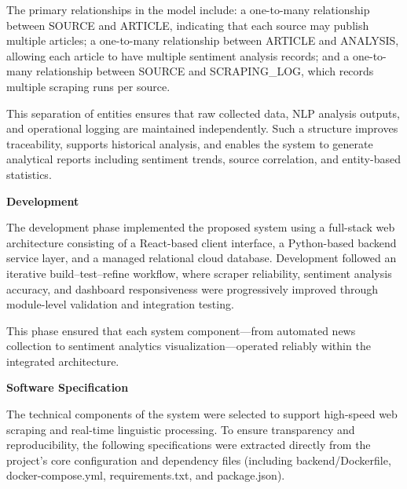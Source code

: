 The primary relationships in the model include: a one-to-many relationship between SOURCE and ARTICLE, indicating that each source may publish multiple articles; a one-to-many relationship between ARTICLE and ANALYSIS, allowing each article to have multiple sentiment analysis records; and a one-to-many relationship between SOURCE and SCRAPING\_LOG, which records multiple scraping runs per source.

This separation of entities ensures that raw collected data, NLP analysis outputs, and operational logging are maintained independently. Such a structure improves traceability, supports historical analysis, and enables the system to generate analytical reports including sentiment trends, source correlation, and entity-based statistics.

\textbf{Development}

The development phase implemented the proposed system using a full-stack web architecture consisting of a React-based client interface, a Python-based backend service layer, and a managed relational cloud database. Development followed an iterative build--test--refine workflow, where scraper reliability, sentiment analysis accuracy, and dashboard responsiveness were progressively improved through module-level validation and integration testing.

This phase ensured that each system component---from automated news collection to sentiment analytics visualization---operated reliably within the integrated architecture.

\textbf{Software Specification}

The technical components of the system were selected to support high-speed web scraping and real-time linguistic processing. To ensure transparency and reproducibility, the following specifications were extracted directly from the project's core configuration and dependency files (including backend/Dockerfile, docker-compose.yml, requirements.txt, and package.json).

